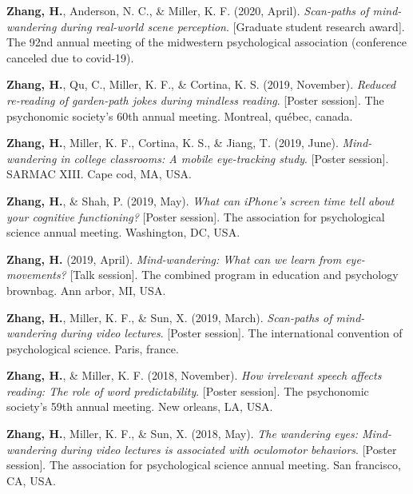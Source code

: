 \documentclass[11pt,a4paper,]{awesome-cv}
\begin{document}
\leavevmode{}%
\textbf{Zhang, H.}, Anderson, N. C., \& Miller, K. F. (2020, April).
\emph{Scan-paths of mind-wandering during real-world scene perception}.
{[}Graduate student research award{]}. The 92nd annual meeting of the
midwestern psychological association (conference canceled due to
covid-19).

\leavevmode{}%
\textbf{Zhang, H.}, Qu, C., Miller, K. F., \& Cortina, K. S. (2019,
November). \emph{Reduced re-reading of garden-path jokes during mindless
reading}. {[}Poster session{]}. The psychonomic society's 60th annual
meeting. Montreal, québec, canada.

\leavevmode{}%
\textbf{Zhang, H.}, Miller, K. F., Cortina, K. S., \& Jiang, T. (2019,
June). \emph{Mind-wandering in college classrooms: A mobile eye-tracking
study}. {[}Poster session{]}. SARMAC XIII. Cape cod, MA, USA.

\leavevmode{}%
\textbf{Zhang, H.}, \& Shah, P. (2019, May). \emph{What can iPhone's
screen time tell about your cognitive functioning?} {[}Poster
session{]}. The association for psychological science annual meeting.
Washington, DC, USA.

\leavevmode{}%
\textbf{Zhang, H.} (2019, April). \emph{Mind-wandering: What can we
learn from eye-movements?} {[}Talk session{]}. The combined program in
education and psychology brownbag. Ann arbor, MI, USA.

\leavevmode{}%
\textbf{Zhang, H.}, Miller, K. F., \& Sun, X. (2019, March).
\emph{Scan-paths of mind-wandering during video lectures}. {[}Poster
session{]}. The international convention of psychological science.
Paris, france.

\leavevmode{}%
\textbf{Zhang, H.}, \& Miller, K. F. (2018, November). \emph{How
irrelevant speech affects reading: The role of word predictability}.
{[}Poster session{]}. The psychonomic society's 59th annual meeting. New
orleans, LA, USA.

\leavevmode{}%
\textbf{Zhang, H.}, Miller, K. F., \& Sun, X. (2018, May). \emph{The
wandering eyes: Mind-wandering during video lectures is associated with
oculomotor behaviors}. {[}Poster session{]}. The association for
psychological science annual meeting. San francisco, CA, USA.
\end{document}
